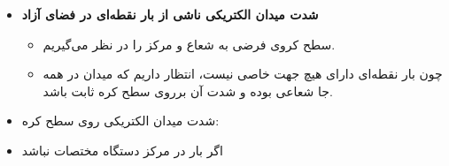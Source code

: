 \begin{ELunit}


\begin{itemize}
\tightlist
\item
  \textbf{شدت میدان الکتریکی ناشی از بار نقطه‌ای  در فضای آزاد}

  \begin{itemize}
  \tightlist
  \item
    سطح کروی فرضی به شعاع  و مرکز  را در نظر می‌گیریم.
  \item
    چون بار نقطه‌ای دارای هیچ جهت خاصی نیست، انتظار داریم که میدان در همه جا شعاعی بوده و شدت آن برروی سطح کره ثابت باشد.
  \end{itemize}
\end{itemize}


\begin{itemize}
\tightlist
\item
  شدت میدان الکتریکی روی سطح کره:
\end{itemize}


\end{ELunit}

\begin{ELimportant}{}


\end{ELimportant}

\begin{ELunit}

\begin{itemize}
\tightlist
\item
  اگر بار در مرکز دستگاه مختصات نباشد
\end{itemize}



\end{ELunit}


